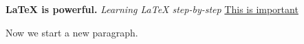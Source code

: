 \documentclass{article}
\begin{document}
\textbf{LaTeX is powerful.} \textit{Learning LaTeX step-by-step} \underline{This is important}

Now we start a new paragraph.
\end{document}
